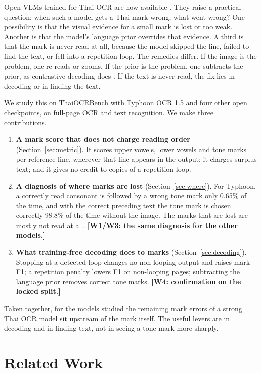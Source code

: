 \documentclass[10pt,twocolumn]{article}
\newcommand{\todo}[1]{\textcolor{red!70!black}{\textbf{[#1]}}}
\begin{document}
Open VLMs trained for Thai OCR are now available \citep{nonesung2026typhoonocr,nectec2026pathumma,pipatanakul2026synthetic}. They raise a practical question: when such a model gets a Thai mark wrong, what went wrong? One possibility is that the visual evidence for a small mark is lost or too weak. Another is that the model's language prior overrides that evidence. A third is that the mark is never read at all, because the model skipped the line, failed to find the text, or fell into a repetition loop. The remedies differ. If the image is the problem, one re-reads or zooms. If the prior is the problem, one subtracts the prior, as contrastive decoding does \citep{leng2024vcd,favero2024m3id}. If the text is never read, the fix lies in decoding or in finding the text.

We study this on ThaiOCRBench with Typhoon OCR 1.5 and four other open checkpoints, on full-page OCR and text recognition. We make three contributions.
\begin{enumerate}\itemsep0pt
\item \textbf{A mark score that does not charge reading order} (Section~\ref{sec:metric}). It scores upper vowels, lower vowels and tone marks per reference line, wherever that line appears in the output; it charges surplus text; and it gives no credit to copies of a repetition loop.
\item \textbf{A diagnosis of where marks are lost} (Section~\ref{sec:where}). For Typhoon, a correctly read consonant is followed by a wrong tone mark only 0.65\% of the time, and with the correct preceding text the tone mark is chosen correctly 98.8\% of the time without the image. The marks that are lost are mostly not read at all. \todo{W1/W3: the same diagnosis for the other models.}
\item \textbf{What training-free decoding does to marks} (Section~\ref{sec:decoding}). Stopping at a detected loop changes no non-looping output and raises mark F1; a repetition penalty lowers F1 on non-looping pages; subtracting the language prior removes correct tone marks. \todo{W4: confirmation on the locked split.}
\end{enumerate}
Taken together, for the models studied the remaining mark errors of a strong Thai OCR model sit upstream of the mark itself. The useful levers are in decoding and in finding text, not in seeing a tone mark more sharply.

\section{Related Work}
\end{document}
